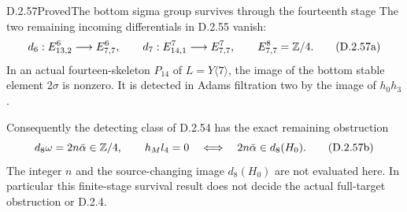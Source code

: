 \begin{claim}{D.2.57}{Proved}{The bottom sigma group survives through the fourteenth stage}
The two remaining incoming differentials in D.2.55 vanish:
\[
 d_6:E^6_{13,2}\longrightarrow E^6_{7,7},\qquad
 d_7:E^7_{14,1}\longrightarrow E^7_{7,7},\qquad
                         E^8_{7,7}=\mathbb Z/4.
 \tag{D.2.57a}
\]
In an actual fourteen-skeleton $P_{14}$ of
$L=Y\langle7\rangle$, the image of the bottom stable
element $2\sigma$ is nonzero.  It is detected in Adams
filtration two by the image of $h_0h_3$.

Consequently the detecting class of D.2.54 has the exact
remaining obstruction
\[
       d_8\omega=2n\bar\alpha\in\mathbb Z/4,
       \qquad
       h_Ml_4=0\quad\Longleftrightarrow\quad
                   2n\bar\alpha\in d_8(H_0).
       \tag{D.2.57b}
\]
The integer $n$ and the source-changing image $d_8(H_0)$
are not evaluated here.  In particular this finite-stage
survival result does not decide the actual full-target
obstruction or D.2.4.
\end{claim}
